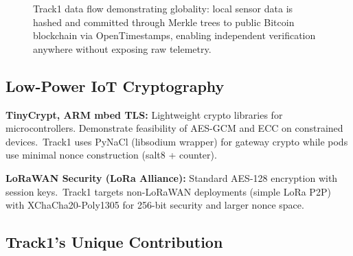 \begin{figure}[htbp]
\caption{Track1 data flow demonstrating globality: local sensor data is hashed and committed through Merkle trees to public Bitcoin blockchain via OpenTimestamps, enabling independent verification anywhere without exposing raw telemetry.}
\label{fig:globality}
\end{figure}

\subsection{Low-Power IoT Cryptography}

\textbf{TinyCrypt, ARM mbed TLS:} Lightweight crypto libraries for microcontrollers. Demonstrate feasibility of AES-GCM and ECC on constrained devices.\ Track1 uses PyNaCl (libsodium wrapper) for gateway crypto while pods use minimal nonce construction (salt8 + counter).

\textbf{LoRaWAN Security (LoRa Alliance):} Standard AES-128 encryption with session keys.\ Track1 targets non-LoRaWAN deployments (simple LoRa P2P) with XChaCha20-Poly1305 for 256-bit security and larger nonce space.

\subsection{Track1's Unique Contribution}

